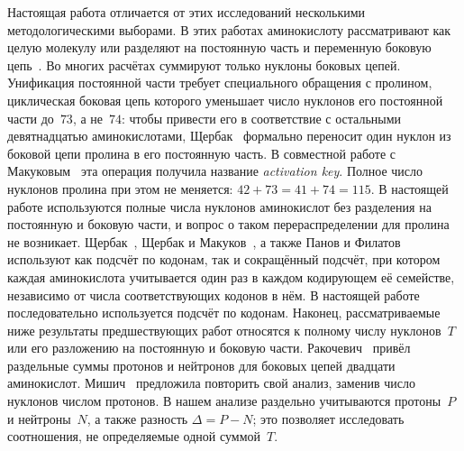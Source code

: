 \documentclass[11pt,a4paper]{article}
\renewcommand{\_}{\origunderscore\allowbreak}
\begin{document}
Настоящая работа отличается от этих исследований
несколькими методологическими выборами. В этих работах аминокислоту рассматривают как целую молекулу или разделяют
на постоянную часть и переменную боковую цепь~\cite{shcherbak1993,shcherbak2003,makukov2013,panov2024}.
Во многих расчётах суммируют только нуклоны боковых цепей. Унификация постоянной части требует
специального обращения с пролином,
циклическая боковая цепь которого уменьшает
число нуклонов его постоянной части до~$73$,
а не~$74$: чтобы привести
его в соответствие с остальными девятнадцатью
аминокислотами, Щербак~\cite{shcherbak1993} формально переносит один нуклон
из боковой цепи пролина в его постоянную часть. В совместной работе с
Макуковым~\cite{makukov2013} эта операция получила название \emph{activation key}. Полное число нуклонов пролина
при этом не меняется: $42+73=41+74=115$.
В настоящей работе
используются полные числа нуклонов аминокислот без
разделения на постоянную и боковую части, и
вопрос о таком перераспределении для пролина не возникает.
Щербак~\cite{shcherbak2003}, Щербак и Макуков~\cite{makukov2013}, а также Панов и Филатов~\cite{panov2024} используют как
подсчёт по кодонам, так и сокращённый подсчёт,
при котором каждая аминокислота
учитывается один раз в каждом кодирующем её семействе,
независимо от числа соответствующих кодонов в нём.
В настоящей работе последовательно используется
подсчёт по кодонам. Наконец, рассматриваемые ниже
результаты предшествующих работ относятся к полному
числу нуклонов~$T$ или его разложению на постоянную
и боковую части. Ракочевич~\cite{rakocevic2011} привёл раздельные суммы протонов
и нейтронов для боковых цепей двадцати аминокислот.
Мишич~\cite{misic2016} предложила повторить свой анализ, заменив число нуклонов числом протонов.
В нашем анализе раздельно учитываются
протоны~$P$ и нейтроны~$N$, а также разность
$\Delta = P - N$; это позволяет исследовать
соотношения, не определяемые одной суммой~$T$.
\end{document}
